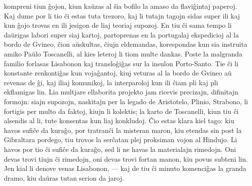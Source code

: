 kompreni tiun \^gojon, kiun ka\u uzas al \^sia bofilo la amaso da
flavi\^gintaj paperoj. Kaj dume por li tio \^ci estas tuta trezoro,
kaj li tutajn tagojn sidas super ili kaj kun \^gojo trovas en ili
jesigon de liaj teoriaj supozoj. En tiu \^ci sama tempo li da\u
urigas labori super siaj kartoj, partoprenas en la portugalaj
ekspedicioj al la bordo de Gvineo, \^cion a\u uskultas, \^ciujn
eldemandas, korespondas kun sia instruita amiko Pa\u ulo Toscanelli,
al kies leteroj li tiom multe dankas. Poste la malgranda familio
forlasas Lisabonon kaj translo\^gi\^gas sur la insulon Porto-Santo.
Tie \^ci li konstante renkonti\^gas kun voja\^gantoj, kiuj veturas
al la bordo de Gvineo a\u u revenas de \^gi, kaj iliaj komunikoj, la
interparoloj kun ili \^ciam pli kaj pli ekflamigas lin. Lia multjare
ellaborita projekto jam ricevis precizajn, difinitajn formojn: siajn
supozojn, naskitajn per la legado de Aristotelo, Plinio, Strabono,
li fortigis per multo da faktoj, kiujn li kolektis; la karto de
Toscanelli, kiun tiu \^ci alsendis al li, tute konsentas kun liaj
konkludoj. \^Cio estas klara kiel tago: kiu havos sufi\^ce da
kura\^go, por tratran\^ci la misteran maron, kiu etendas sin post la
Gibraltara pordego, tiu trovos la ser\^catan plej proksiman vojon al
Hindujo. Li havos por tio \^ci sufi\^ce da kura\^go, sed li ne havas
la materialajn rimedojn. Oni devas trovi tiujn \^ci rimedojn, oni
devas trovi fortan manon, kiu povus subteni lin. Jen kial li denove
venas Lisabonon, --- kaj de tiu \^ci minuto komenci\^gas la granda
dramo, kiu da\u uras tutan serion da jaroj.

